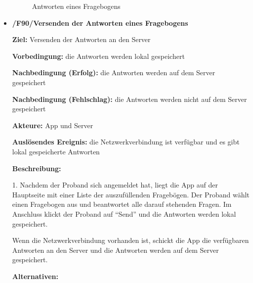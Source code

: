 \documentclass[a4paper]{scrreprt}
\begin{document}
\begin{itemize}
\begin{figure}[ht]
                        \caption{Antworten eines Fragebogens}
                    \end{figure}


                \item \textbf{/F90/Versenden der Antworten eines Fragebogens}

                \par \textbf{Ziel: }Versenden der Antworten an den Server
                \par \textbf{Vorbedingung: }die Antworten werden lokal gespeichert
                \par \textbf{Nachbedingung (Erfolg): }die Antworten werden auf dem Server gespeichert
                \par \textbf{Nachbedingung (Fehlschlag): }die Antworten werden nicht auf dem Server gespeichert
                \par \textbf{Akteure: }App und Server
                \par \textbf{Auslösendes Ereignis: }die Netzwerkverbindung ist verfügbar und es gibt lokal gespeicherte Antworten
                \par \textbf{Beschreibung: }
                \par 1. Nachdem der \gls{Proband} sich angemeldet hat, liegt die App auf der Hauptseite mit einer Liste der auszufüllenden Fragebögen. Der \gls{Proband} wählt einen Fragebogen aus und beantwortet alle darauf stehenden Fragen. Im Anschluss klickt der \gls{Proband} auf ``Send'' und die Antworten werden lokal gespeichert.
                \par Wenn die Netzwerkverbindung vorhanden ist, schickt die App die verfügbaren Antworten an den Server und die Antworten werden auf dem Server gespeichert.
                \par \textbf{Alternativen: }
                \begin{figure}[ht]
                    \centering

\end{figure}
\end{itemize}
\end{document}
